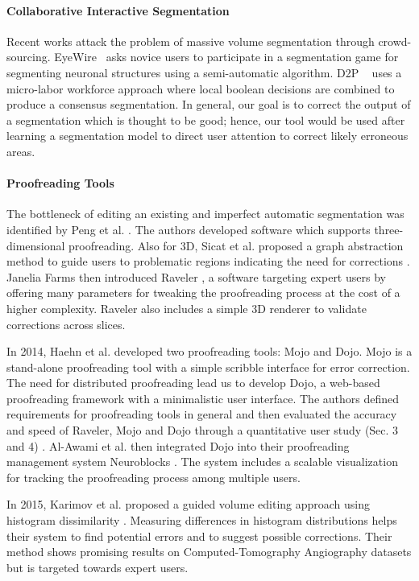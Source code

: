 \paragraph{Collaborative Interactive Segmentation}

Recent works attack the problem of massive volume segmentation through crowd-sourcing\cite{saalfeld09,anderson2011}. EyeWire~\cite{eyewire2012} asks novice users to participate in a segmentation game for segmenting neuronal structures using a semi-automatic algorithm. D2P ~\cite{Giuly2013DP2} uses a micro-labor workforce approach where local boolean decisions are combined to produce a consensus segmentation. In general, our goal is to correct the output of a segmentation which is thought to be good; hence, our tool would be used after learning a segmentation model to direct user attention to correct likely erroneous areas.

\paragraph{Proofreading Tools}
The bottleneck of editing an existing and imperfect automatic segmentation was identified by Peng et al. \cite{proofreading_bottleneck}. The authors developed software which supports three-dimensional proofreading. Also for 3D, Sicat et al. proposed a graph abstraction method to guide users to problematic regions indicating the need for corrections \cite{markus_proofreading}. Janelia Farms then introduced Raveler \cite{raveler}, a software targeting expert users by offering many parameters for tweaking the proofreading process at the cost of a higher complexity. Raveler also includes a simple 3D renderer to validate corrections across slices.

In 2014, Haehn et al. developed two proofreading tools: Mojo and Dojo. Mojo is a stand-alone proofreading tool with a simple scribble interface for error correction. The need for distributed proofreading lead us to develop Dojo, a web-based proofreading framework with a minimalistic user interface. The authors defined requirements for proofreading tools in general and then evaluated the accuracy and speed of Raveler, Mojo and Dojo through a quantitative user study (Sec. 3 and 4) \cite{haehn_dojo_2014}. 
Al-Awami et al. then integrated Dojo into their proofreading management system Neuroblocks \cite{Neuroblocks}. The system includes a scalable visualization for tracking the proofreading process among multiple users.

In 2015, Karimov et al. proposed a guided volume editing approach using histogram dissimilarity \cite{karimov_guided_volume_editing}. Measuring differences in histogram distributions helps their system to find potential errors and to suggest possible corrections. Their method shows promising results on Computed-Tomography Angiography datasets but is targeted towards expert users.

